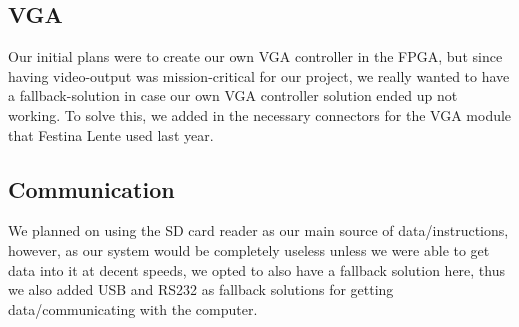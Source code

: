\subsection{VGA}
Our initial plans were to create our own \ac{VGA} controller in the \ac{FPGA}, but since having video-output was mission-critical
for our project, we really wanted to have a fallback-solution in case our own
\ac{VGA} controller solution ended up not working.
To solve this, we added in the necessary connectors for the \ac{VGA} module that Festina Lente used last year.

\subsection {Communication}
We planned on using the \ac{SD} card reader as our main source of data/instructions, however, as our system would
be completely useless unless we were able to get data into it at decent speeds, we opted to also have a fallback
solution here, thus we also added \ac{USB} and RS232 as fallback solutions for getting data/communicating with the
computer.
